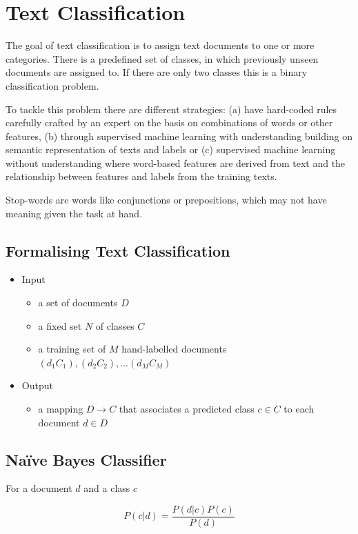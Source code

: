 \documentclass[11pt]{article}
\begin{document}
\section{Text Classification}
The goal of text classification is to assign text documents to one or more categories. There is a predefined set of classes, in which previously unseen documents are assigned to. If there are only two classes this is a binary classification problem.

To tackle this problem there are different strategies: (a) have hard-coded rules carefully crafted by an expert on the basis on combinations of words or other features, (b) through supervised machine learning with understanding building on semantic representation of texts and labels or (c) supervised machine learning without understanding where word-based features are derived from text and the relationship between features and labels from the training texts.

Stop-words are words like conjunctions or prepositions, which may not have meaning given the task at hand.

\subsection{Formalising Text Classification}

\begin{itemize}[label=]
	\item Input
	\begin{itemize}
		\item a set of documents $D$
		\item a fixed set $N$ of classes $C$
		\item a training set of $M$ hand-labelled documents $(d_1 C_1),(d_2 C_2), \dots (d_M C_M)$
	\end{itemize}
	\item Output
	\begin{itemize}
		\item a mapping $D\rightarrow C$ that associates a predicted class $c\in C$ to each document $d\in D$
	\end{itemize}
\end{itemize}

\subsection{Naïve Bayes Classifier}
For a document $d$ and a class $c$

\begin{equation*}
	P(c|d) = \frac{P(d|c)P(c)}{P(d)}
\end{equation*}
\end{document}
